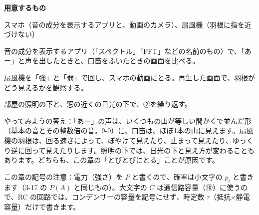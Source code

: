 \begin{yattemiyou}
\textbf{用意するもの}\par
スマホ（音の成分を表示するアプリと、動画のカメラ）、扇風機（羽根に指を近づけない）\par\vspace{2pt}
\begin{enumerate}[label={\bkcircled[bkGreen]{\arabic*}}, leftmargin=2.4\zw, itemsep=1pt, topsep=0pt]
\item 音の成分を表示するアプリ（「スペクトル」「FFT」などの名前のもの）で、「あー」と声を出したときと、口笛をふいたときの画面を比べる。
\item 扇風機を「強」と「弱」で回し、スマホの動画にとる。再生した画面で、羽根がどう見えるかを観察する。
\item 部屋の照明の下と、窓の近くの日光の下で、②を繰り返す。
\end{enumerate}
\end{yattemiyou}

\noindent やってみようの答え：「あー」の声は、いくつもの山が等しい間かくで並んだ形（基本の音とその整数倍の音。9-0）に、口笛は、ほぼ1本の山に見えます。扇風機の羽根は、回る速さによって、ぼやけて見えたり、止まって見えたり、ゆっくり逆に回って見えたりします。照明の下では、日光の下と見え方が変わることもあります。どちらも、この章の「とびとびにとる」ことが原因です。

\begin{omoidasou}
\end{omoidasou}

\noindent この章の記号の注意：電力（強さ）を $P$ と書くので、確率は小文字の $p_i$ と書きます（3-17 の $P(A)$ と同じもの）。大文字の $C$ は通信路容量（⑩）に使うので、RC の回路では、コンデンサーの容量を記号にせず、時定数 $\tau$（抵抗×静電容量）だけで書きます。


